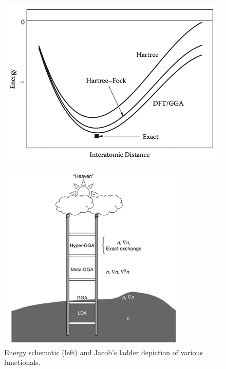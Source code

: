 \documentclass[3p,review,12pt]{elsarticle}
\begin{document}
\begin{figure}[h]
	\centering
	\begin{minipage}[b]{0.45\textwidth}
		\includegraphics[width=\textwidth]{lee1}
	\end{minipage}
	\hfill
	\begin{minipage}[b]{0.45\textwidth}
		\includegraphics[width=0.8\textwidth]{sholl1}
		\centering
	\end{minipage}
	\caption{Energy schematic \cite{Lee2012} (left) and Jacob's ladder depiction \cite{Sholl2009} of various functionals.}
\end{figure}
\end{document}
